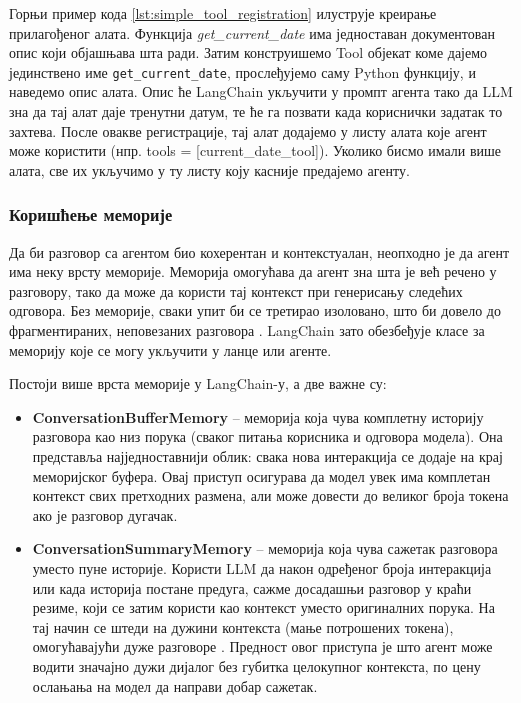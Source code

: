 Горњи пример кода \ref{lst:simple_tool_registration} илуструје креирање прилагођеног алата. Функција \textit{get\_current\_date} има једноставан документован опис који објашњава шта ради. Затим конструишемо Tool објекат коме дајемо јединствено име \texttt{get\_current\_date}, прослеђујемо саму Python функцију, и наведемо опис алата. Опис ће LangChain укључити у промпт агента тако да LLM зна да тај алат даје тренутни датум, те ће га позвати када кориснички задатак то захтева. После овакве регистрације, тај алат додајемо у листу алата које агент може користити (нпр. tools = [current\_date\_tool]). Уколико бисмо имали више алата, све их укључимо у ту листу коју касније предајемо агенту.
\newline

\subsubsection{Коришћење меморије}

Да би разговор са агентом био кохерентан и контекстуалан, неопходно је да агент има неку врсту меморије. Меморија омогућава да агент зна шта је већ речено у разговору, тако да може да користи тај контекст при генерисању следећих одговора. Без меморије, сваки упит би се третирао изоловано, што би довело до фрагментираних, неповезаних разговора \cite{langchain_docs_2024}. LangChain зато обезбеђује класе за меморију које се могу укључити у ланце или агенте.

Постоји више врста меморије у LangChain-у, а две важне су:
\begin{itemize}
    \item \textbf{ConversationBufferMemory} -- меморија која чува комплетну историју разговора као низ порука (сваког питања корисника и одговора модела). Она представља најједноставнији облик: свака нова интеракција се додаје на крај меморијског буфера. Овај приступ осигурава да модел увек има комплетан контекст свих претходних размена, али може довести до великог броја токена ако је разговор дугачак.
    \item \textbf{ConversationSummaryMemory} -- меморија која чува сажетак разговора уместо пуне историје. Користи LLM да након одређеног броја интеракција или када историја постане предуга, сажме досадашњи разговор у краћи резиме, који се затим користи као контекст уместо оригиналних порука. На тај начин се штеди на дужини контекста (мање потрошених токена), омогућавајући дуже разговоре \cite{langchain_docs_2024}. Предност овог приступа је што агент може водити значајно дужи дијалог без губитка целокупног контекста, по цену ослањања на модел да направи добар сажетак.
\end{itemize}

